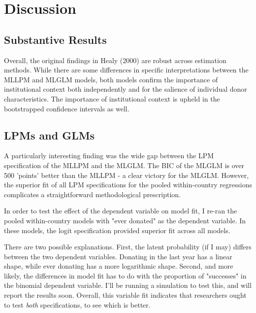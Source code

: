 \documentclass[11pt,article,oneside]{memoir}
\begin{document}
\section{Discussion}\label{discussion}

\subsection{Substantive Results}

Overall, the original findings in Healy (2000) are robust across estimation methods. While there are some differences in specific interpretations between the MLLPM and MLGLM models, both models confirm the importance of institutional context both independently and for the salience of individual donor characteristics. The importance of institutional context is upheld in the bootstrapped confidence intervals as well.

\subsection{LPMs and GLMs}

A particularly interesting finding was the wide gap between the LPM specification of the MLLPM and the MLGLM. The BIC of the MLGLM is over 500 'points' better than the MLLPM - a clear victory for the MLGLM. However, the superior fit of all LPM specifications for the pooled within-country regressions complicates a straightforward methodological prescription.

In order to test the effect of the dependent variable on model fit, I re-ran the pooled within-country models with "ever donated" as the dependent variable. In these models, the logit specification provided superior fit across all models. 

There are two possible explanations. First, the latent probability (if I may) differs between the two dependent variables. Donating in the last year has a linear shape, while ever donating has a more logarithmic shape. Second, and more likely, the differences in model fit has to do with the proportion of "successes" in the binomial dependent variable. I'll be running a simulation to test this, and will report the results soon. Overall, this variable fit indicates that researchers ought to test \emph{both} specifications, to see which is better.



\begin{landscape}

\end{landscape}
\restoregeometry
\end{document}
